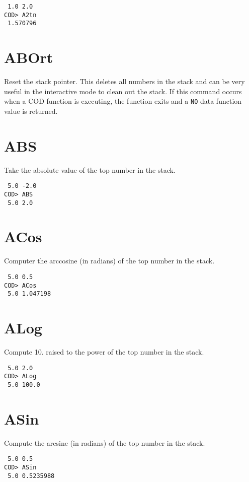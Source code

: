 \medskip
{}
\begin{verbatim}
 1.0 2.0
COD> A2tn
 1.570796
\end{verbatim}

\section*{ABOrt}
Reset the stack pointer.
This deletes all numbers in the stack
and can be very useful in the interactive mode to clean out the stack.
If this command occurs when a COD function is executing,
the function exits and a {\tt NO} data function value is returned.

\section*{ABS}
Take the absolute value of the top number in the stack.

\medskip
{}
\begin{verbatim}
 5.0 -2.0
COD> ABS
 5.0 2.0
\end{verbatim}

\section*{ACos}
Computer the arccosine (in radians) of the top number in the stack.

\medskip
{}
\begin{verbatim}
 5.0 0.5
COD> ACos
 5.0 1.047198
\end{verbatim}

\section*{ALog}
Compute 10. raised to the power of the top number in the stack.

\medskip
{}
\begin{verbatim}
 5.0 2.0
COD> ALog
 5.0 100.0
\end{verbatim}

\section*{ASin}
Compute the arcsine (in radians) of the top number in the stack.

\medskip
{}
\begin{verbatim}
 5.0 0.5
COD> ASin
 5.0 0.5235988
\end{verbatim}


